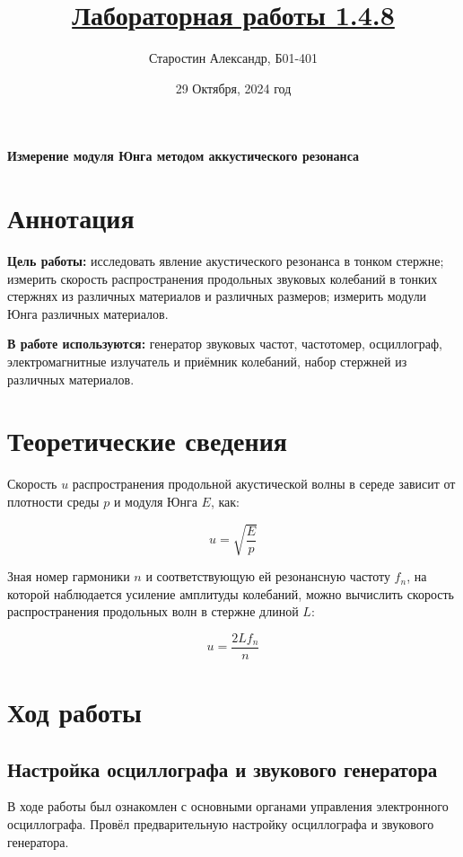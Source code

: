 \documentclass[a4paper]{article}
\title{\underline{Лабораторная работы 1.4.8}}
\author{Старостин Александр, Б01-401}
\date {29 Октября, 2024 год}
\begin{document}
\maketitle
\newpage

\textbf{Измерение модуля Юнга методом аккустического резонанса}

\section{Аннотация}
    \par \textbf{Цель работы:} исследовать явление акустического резонанса в тонком стержне; измерить скорость распространения продольных звуковых колебаний в тонких стержнях из различных материалов и различных размеров; измерить модули Юнга различных материалов.\\

    \par \textbf{В работе используются:} генератор звуковых частот, частотомер, осциллограф, электромагнитные излучатель и приёмник колебаний, набор стержней из различных материалов.

\section{Теоретические сведения}

Скорость $u$ распространения продольной акустической волны в середе зависит от плотности среды $p$ и модуля Юнга $E$, как:

\begin{equation}
	u = \sqrt{\frac{E}{p}}
\end{equation}

Зная номер гармоники $n$ и соответствующую ей резонансную частоту $f_n$, на которой наблюдается усиление амплитуды колебаний, можно вычислить скорость распространения продольных волн в стержне длиной $L$:

\begin{equation}
	u = \frac{2 L f_n}{n}
\end{equation}

\section{Ход работы}

\subsection{Настройка осциллографа и звукового генератора}
\item В ходе работы был ознакомлен с основными органами управления электронного осциллографа. Провёл предварительную настройку осциллографа и звукового генератора.
\end{document}
